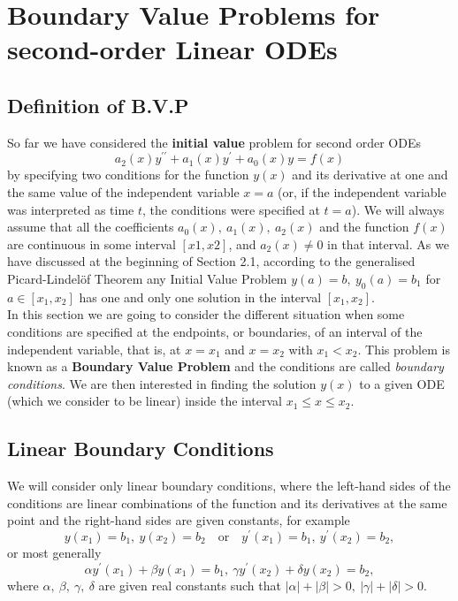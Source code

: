 \documentclass[11pt,a4paper,twoside]{article}
\begin{document}
	\mytitle
	\section{Boundary Value Problems for second-order Linear ODEs}
	\subsection{Definition of B.V.P}
	So far we have considered the \textbf{initial value} problem for second order ODEs
	\begin{equation}\label{3.1}
		a_2(x)y^{\prime\prime} + a_1(x)y^\prime + a_0(x)y = f(x)
	\end{equation}
	by specifying two conditions for the function $y(x)$ and its derivative at one and the same value of the independent variable $x = a$ (or, if the independent variable was interpreted as time $t$, the conditions were specified at $t = a$). We will always assume that all the coefficients $a_0(x),\ a_1(x),\ a_2(x)$ and the function $f(x)$ are continuous in some interval $[x1, x2]$, and $a_2(x) \neq 0$ in that interval. As we have discussed at the beginning of Section 2.1, according to the generalised Picard-Lindel\"{o}f Theorem any Initial Value Problem $y(a) = b,\ y_0 (a) = b_1$ for $a \in [x_1, x_2]$ has one and only one solution in the interval $[x_1, x_2]$.\\
	In this section we are going to consider the different situation when some conditions are specified at the endpoints, or boundaries, of an interval of the independent variable, that is, at $x = x_1$ and $x = x_2$ with $x_1 < x_2$. This problem is known as a \textbf{Boundary Value Problem} and the conditions are called \textit{boundary conditions}. We are then interested in finding the solution $y(x)$ to a given ODE (which we consider to be linear) inside the interval $x_1 \leq x \leq x_2$.
	\subsection{ Linear Boundary Conditions}
	We will consider only linear boundary conditions, where the left-hand sides of the conditions are linear combinations of the function and its derivatives at the same point and the right-hand sides are given constants, for example
	$$
	y(x_1) = b_1,\ y(x_2) = b_2\quad \text{or}\quad y^\prime(x_1) = b_1,\ y^\prime(x_2) = b_2, 
	$$
	or most generally
	\begin{equation}\label{3.2}
		\alpha y^\prime (x_1) + \beta y(x_1) = b_1,\ \gamma y^\prime (x_2) + \delta y(x_2) = b_2,
	\end{equation}
	where $\alpha,\ \beta,\ \gamma,\ \delta$ are given real constants such that $|\alpha| + |\beta| > 0,\ |\gamma| + |\delta| > 0$.
\end{document}
